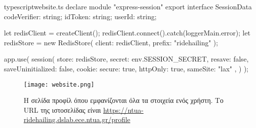 \documentclass[../thesis.tex]{subfiles}
\begin{document}
\begin{codeblock}{typescript}{website.ts}
  declare module "express-session" {
    export interface SessionData {
      codeVerifier: string;
      idToken: string;
      userId: string;
    }
  }

  let redisClient = createClient();
  redisClient.connect().catch(loggerMain.error);
  let redisStore = new RedisStore({ client: redisClient, prefix: "ridehailing" });

  app.use(
    session({
      store: redisStore,
      secret: env.SESSION_SECRET,
      resave: false,
      saveUninitialized: false,
      cookie: { secure: true, httpOnly: true, sameSite: "lax" },
    })
  );
\end{codeblock}

\begin{figure}
  \centering
  \texttt{[image: website.png]}
  \caption{Η σελίδα προφίλ όπου εμφανίζονται όλα τα στοιχεία ενός χρήστη. Το URL της ιστοσελίδας είναι \url{https://ntua-ridehailing.dslab.ece.ntua.gr/profile}}
\end{figure}
\end{document}

